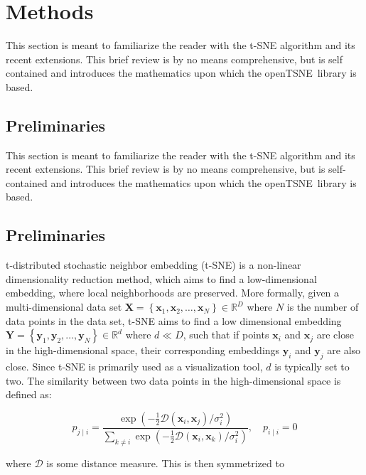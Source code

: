 \documentclass[twocolumn]{bmcart}
\newcommand{\opentsne}{\textsf{openTSNE}}
\begin{document}
\section*{Methods}

This section is meant to familiarize the reader with the t-SNE algorithm and its recent extensions. This brief review is by no means comprehensive, but is self contained and introduces the mathematics upon which the \opentsne\ library is based.

\subsection*{Preliminaries}
This section is meant to familiarize the reader with the t-SNE algorithm and its recent extensions. This brief review is by no means comprehensive, but is self-contained and introduces the mathematics upon which the \opentsne\ library is based.

\subsection*{Preliminaries}

t-distributed stochastic neighbor embedding (t-SNE) is a non-linear dimensionality reduction method, which aims to find a low-dimensional embedding, where local neighborhoods are preserved. More formally, given a multi-dimensional data set $\mathbf{X} = \left \{ \mathbf{x}_1,
\mathbf{x}_2, \dots, \mathbf{x}_N \right \} \in \mathbb{R}^D$ where $N$ is the
number of data points in the data set, t-SNE aims to find a low
dimensional embedding $\mathbf{Y} = \left \{ \mathbf{y}_1, \mathbf{y}_2, \dots,
\mathbf{y}_N \right \} \in \mathbb{R}^d$ where $d \ll D$, such that if points
$\mathbf{x}_i$ and $\mathbf{x}_j$ are close in the high-dimensional space,
their corresponding embeddings $\mathbf{y}_i$ and $\mathbf{y}_j$ are also
close. Since t-SNE is primarily used as a visualization tool, $d$ is typically
set to two. The similarity between two data points in the high-dimensional space is defined as:

\begin{equation}
p_{j \mid i} = \frac{\exp \left ( -\frac{1}{2} \mathcal{D}(\mathbf{x}_i, \mathbf{x}_j ) / \sigma_i^2 \right )}
{\sum_{k \neq i } \exp \left ( -\frac{1}{2} \mathcal{D}(\mathbf{x}_i, \mathbf{x}_k ) / \sigma_i^2 \right )}, \quad p_{i \mid i} = 0
\label{eq:gaussian_kernel}
\end{equation}

\noindent where $\mathcal{D}$ is some distance measure. This is then symmetrized to
\end{document}
